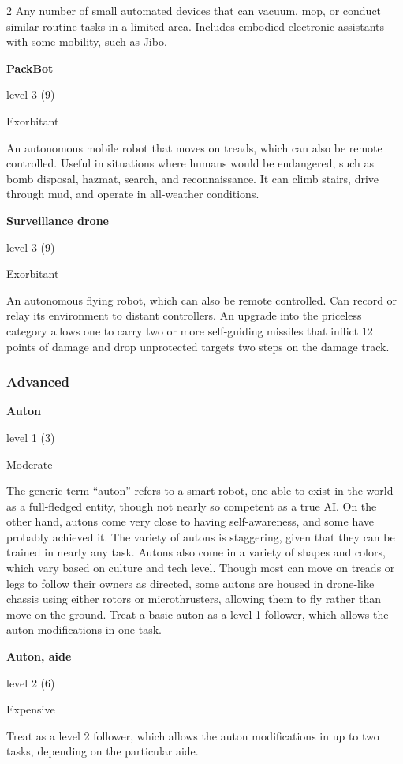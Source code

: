 \begin{multicols}{2}
Any number of small automated devices that can vacuum, mop, or conduct similar routine tasks in a limited area. Includes embodied electronic assistants with some mobility, such as Jibo. 

\textbf{PackBot} 

level 3 (9) 

Exorbitant 

An autonomous mobile robot that moves on treads, which can also be remote controlled. Useful in situations where humans would be endangered, such as bomb disposal, hazmat, search, and reconnaissance. It can climb stairs, drive through mud, and operate in all-weather conditions. 

\textbf{Surveillance drone} 

level 3 (9) 

Exorbitant 

An autonomous flying robot, which can also be remote controlled. Can record or relay its environment to distant controllers. An upgrade into the priceless category allows one to carry two or more self-guiding missiles that inflict 12 points of damage and drop unprotected targets two steps on the damage track. 

\subsubsection{Advanced}

\textbf{Auton}

level 1 (3) 

Moderate 

The generic term “auton” refers to a smart robot, one able to exist in the world as a full-fledged entity, though not nearly so competent as a true AI. On the other hand, autons come very close to having self-awareness, and some have probably achieved it. The variety of autons is staggering, given that they can be trained in nearly any task. Autons also come in a variety of shapes and colors, which vary based on culture and tech level. Though most can move on treads or legs to follow their owners as directed, some autons are housed in drone-like chassis using either rotors or microthrusters, allowing them to fly rather than move on the ground. Treat a basic auton as a level 1 follower, which allows the auton modifications in one task. 

\textbf{Auton, aide} 

level 2 (6)

Expensive 

Treat as a level 2 follower, which allows the auton modifications in up to two tasks, depending on the particular aide. 


\end{multicols}

